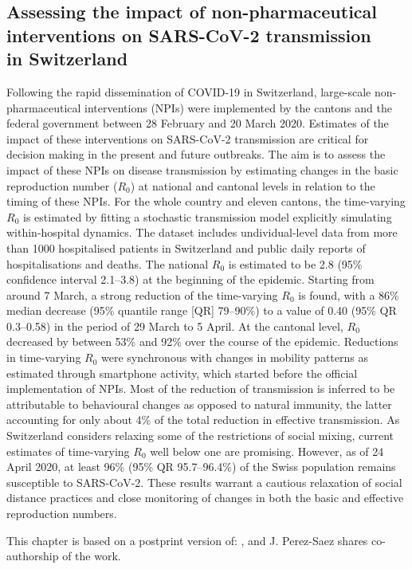 \begin{fullwidth}
\chapter[Assessing the impact of non-pharmaceutical interventions on SARS-CoV-2 transmission in Switzerland]{Assessing the impact of non-pharmaceutical\\ interventions on SARS-CoV-2 transmission\\ in Switzerland}
\label{ch:covid-switzerland-npi}

Following the rapid dissemination of COVID-19 in Switzerland, large-scale non-pharmaceutical interventions (NPIs) were implemented by the cantons and the federal government between 28 February and 20 March 2020. Estimates of the impact of these interventions on SARS-CoV-2 transmission are critical for decision making in the present and future outbreaks. The aim is to assess the impact of these NPIs on disease transmission by estimating changes in the basic reproduction number ($R_0$) at national and cantonal levels in relation to the timing of these NPIs. For the whole country and eleven cantons, the time-varying $R_0$ is estimated by fitting a stochastic transmission model explicitly simulating within-hospital dynamics. The dataset includes undividual-level data from more than 1000 hospitalised patients in Switzerland and public daily reports of hospitalisations and deaths. The national $R_0$ is estimated to be 2.8 (95\% confidence interval 2.1–3.8) at the beginning of the epidemic. Starting from around 7 March, a strong reduction of the time-varying $R_0$ is found, with a 86\% median decrease (95\% quantile range [QR] 79–90\%) to a value of 0.40 (95\% QR 0.3–0.58) in the period of 29 March to 5 April. At the cantonal level, $R_0$ decreased by between 53\% and 92\% over the course of the epidemic. Reductions in time-varying $R_0$ were synchronous with changes in mobility patterns as estimated through smartphone activity, which started before the official implementation of NPIs. Most of the reduction of transmission is inferred to be attributable to behavioural changes as opposed to natural immunity, the latter accounting for only about 4\% of the total reduction in effective transmission. As Switzerland considers relaxing some of the restrictions of social mixing, current estimates of time-varying $R_0$ well below one are promising. However, as of 24 April 2020, at least 96\% (95\% QR 95.7–96.4\%) of the Swiss population remains susceptible to SARS-CoV-2. These results warrant a cautious relaxation of social distance practices and close monitoring of changes in both the basic and effective reproduction numbers.

This chapter is based on a postprint version of:
, and J. Perez-Saez shares co-authorship of the work.
\end{fullwidth}

